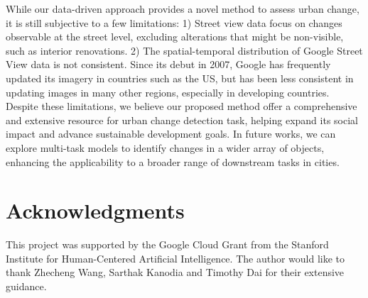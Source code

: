 \documentclass[letterpaper]{article} %
\begin{document}
While our data-driven approach provides a novel method to assess urban change, it is still subjective to a few limitations: 1) Street view data focus on changes observable at the street level, excluding alterations that might be non-visible, such as interior renovations. 2) The spatial-temporal distribution of Google Street View data is not consistent. Since its debut in 2007, Google has frequently updated its imagery in countries such as the US, but has been less consistent in updating images in many other regions, especially in developing countries. 
Despite these limitations, we believe our proposed method offer a comprehensive and extensive resource for urban change detection task, helping expand its social impact and advance sustainable development goals. 
In future works, we can explore multi-task models to identify changes in a wider array of objects, 
enhancing the applicability to a broader range of downstream tasks in cities.

\section{Acknowledgments}
This project was supported by the Google Cloud Grant from the Stanford Institute for Human-Centered Artificial Intelligence. The author would like to thank Zhecheng Wang, Sarthak Kanodia and Timothy Dai for their extensive guidance.

\end{document}
